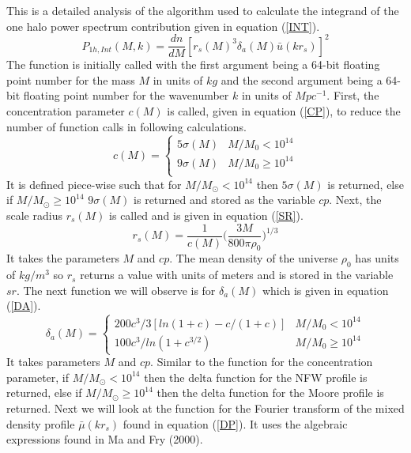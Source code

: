 \documentclass[12pt]{article}
\begin{document}
This is a detailed analysis of the algorithm used to calculate the integrand of the one halo power spectrum contribution given in equation (\ref{INT}). 
\begin{equation} \label{INT}
    P_{1h,Int}(M, k) = \frac{dn}{dM} [r_{s}(M)^3 \delta_a(M) \bar{u} (kr_s)]^2
\end{equation}
The function is initially called with the first argument being a 64-bit floating point number for the mass $M$ in units of $kg$ and the second argument being a 64-bit floating point number for the wavenumber $k$ in units of $Mpc^{-1}$. First, the concentration parameter $c(M)$ is called, given in equation (\ref{CP}), to reduce the number of function calls in following calculations. 
\begin{equation} \label{CP}
	c(M) = 
	\begin{cases}
		5\sigma(M) & M/M_0 < 10^{14} \\
		9\sigma(M) & M/M_0 \geq 10^{14} \\
	\end{cases}
\end{equation}
It is defined piece-wise such that for $M/M_\odot < 10^{14}$ then $5\sigma(M)$ is returned, else if $M/M_\odot \geq 10^{14}$ $9\sigma(M)$ is returned and stored as the variable $cp$. Next, the scale radius $r_s(M)$ is called and is given in equation (\ref{SR}).
\begin{equation} \label{SR}
    r_s(M) = \frac{1}{c(M)} \Big(\frac{3M}{800 \pi \rho_0} \Big)^{1/3}
\end{equation}
It takes the parameters $M$ and $cp$. The mean density of the universe $\rho_0$ has units of $kg / m^3$ so $r_s$ returns a value with units of meters and is stored in the variable $sr$. The next function we will observe is for $\delta_a(M)$ which is given in equation (\ref{DA}).
\begin{equation} \label{DA}
	\delta_a(M) = 
	\begin{cases}
		200c^{3} / 3[ln(1+c) - c/(1+c)] & M/M_0 < 10^{14} \\
		100c^{3} / ln(1+c^{3/2})        & M/M_0 \geq 10^{14}
	\end{cases}
\end{equation}
It takes parameters $M$ and $cp$. Similar to the function for the concentration parameter, if  $M/M_\odot < 10^{14}$ then the delta function for the NFW profile is returned, else if  $M/M_\odot \geq 10^{14}$ then the delta function for the Moore profile is returned. Next we will look at the function for the Fourier transform of the mixed density profile $\bar{\mu}(kr_s)$ found in equation (\ref{DP}). It uses the algebraic expressions found in Ma and Fry (2000). 
\end{document}
